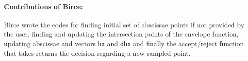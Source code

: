 \documentclass{article}
\begin{document}
\paragraph{Contributions of Birce:} Birce wrote the codes for finding initial set of abscissae points if not provided by the user, finding and updating the intersection points of the envelope function, updating abscissae and vectors \texttt{hx} and \texttt{dhx} and finally the accept/reject function that takes returns the decision regarding a new sampled point. 
\end{document}
